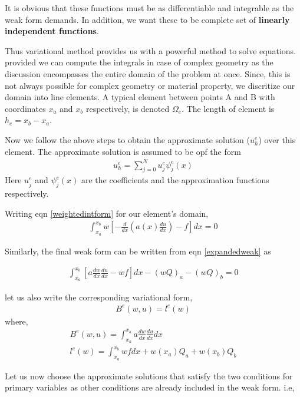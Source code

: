 It is obvious that these functions must be as differentiable and integrable as the weak form demands. In addition, we want these to be complete set of \textbf{linearly independent functions}.

Thus variational method provides us with a powerful method to solve equations. provided we can compute the integrals in case of complex geometry as the discussion encompasses the entire domain of the problem at once. Since, this is not always possible for complex geometry or material property, we discritize our domain into line elements. A typical element between points A and B with coordinates $x_a$ and $x_b$ respectively, is denoted $\Omega_e$. The length of element is $h_e = x_b - x_a$. 

Now we follow the above steps to obtain the approximate solution ($u_h^e$) over this element.
The approximate solution is assumed to be opf the form 
\begin{eqnarray}
	u_h^e = \sum_{j = 0 }^{N} u_j^e \psi_j^e(x)
\end{eqnarray} 
Here $ u_j^e$ and $\psi_j^e(x)$ are the coefficients and the approximation functions respectively. 

Writing eqn \ref{weightedintform} for our element's domain,
\begin{eqnarray}
			\int_{x_a}^{x_b}  w \left[ -\frac{d}{dx} \left( a(x)\frac{du}{dx} \right) - f \right] dx = 0
\end{eqnarray}

Similarly, the final weak form can be written from eqn \ref{expandedweak} as 

\begin{eqnarray}
	 \int_{x_a}^{x_b} \left[ a \frac{dw}{dx} \frac{du}{dx} - wf \right] dx  -(wQ)_a  -(wQ)_b = 0
\end{eqnarray}

let us also write the corresponding variational form,
\begin{eqnarray}\label{variational}
	B^e(w,u) = l^e(w)
\end{eqnarray}
where,
\begin{eqnarray}
	B^e(w,u) = \int_{x_a}^{x_b} a \frac{dw}{dx} \frac{du}{dx} dx \\
	l^e(w) = \int_{x_a}^{x_b} wf dx + w(x_a) Q_a + w(x_b) Q_b
\end{eqnarray}


Let us now choose the approximate solutions that satisfy the two conditions for primary variables as other conditions are already included in the weak form. 
i.e,

